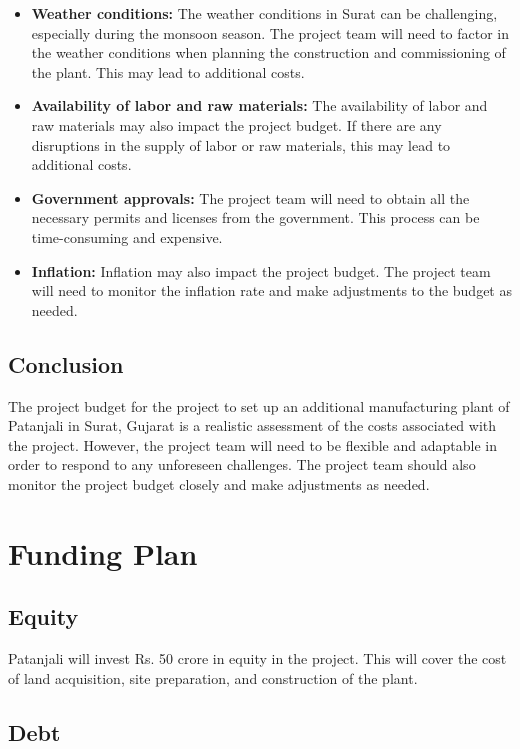 \begin{itemize}
    \item \textbf{Weather conditions:} The weather conditions in Surat can be challenging, especially during the monsoon season. The project team will need to factor in the weather conditions when planning the construction and commissioning of the plant. This may lead to additional costs.
    \item \textbf{Availability of labor and raw materials:} The availability of labor and raw materials may also impact the project budget. If there are any disruptions in the supply of labor or raw materials, this may lead to additional costs.
    \item \textbf{Government approvals:} The project team will need to obtain all the necessary permits and licenses from the government. This process can be time-consuming and expensive.
    \item \textbf{Inflation:} Inflation may also impact the project budget. The project team will need to monitor the inflation rate and make adjustments to the budget as needed.
\end{itemize}

\subsection{Conclusion}

The project budget for the project to set up an additional manufacturing plant of Patanjali in Surat, Gujarat is a realistic assessment of the costs associated with the project. However, the project team will need to be flexible and adaptable in order to respond to any unforeseen challenges. The project team should also monitor the project budget closely and make adjustments as needed.

\section{Funding Plan}

\subsection{Equity}

Patanjali will invest Rs. 50 crore in equity in the project. This will cover the cost of land acquisition, site preparation, and construction of the plant.

\subsection{Debt}

